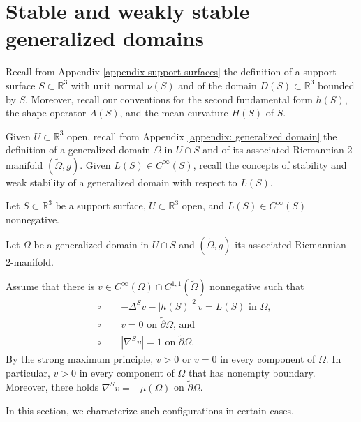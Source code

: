 \documentclass[11pt]{amsart}
\begin{document}
\section{Stable and weakly stable generalized domains}
	
	Recall from Appendix \ref{appendix support surfaces} the definition of a support surface $S\subset \mathbb{R}^3$ with unit normal $\nu(S)$  and of the domain $D(S)\subset \mathbb{R}^3$ bounded by $S$.  Moreover, recall our conventions for the second fundamental form $h(S)$, the shape operator $A(S)$, and the mean curvature $H(S)$ of $S$.
	
Given $U\subset \mathbb{R}^3$ open, recall from Appendix \ref{appendix: generalized domain} the definition of a generalized domain $\Omega$ in $U\cap S$ and of its associated Riemannian 2-manifold $(\tilde \Omega,g)$. Given $L(S)\in C^\infty(S)$, recall the concepts of stability and weak stability of a generalized domain  with respect to $L(S)$.
	
	Let $S\subset \mathbb{R}^3$ be a support surface, $U\subset \mathbb{R}^3$ open, and $L(S)\in C^\infty(S)$  nonnegative. 






Let $\Omega$ be a generalized domain in $U\cap S$ and $(\tilde \Omega,g)$ its associated Riemannian 2-manifold. 

Assume that there is  $ v\in C^\infty(\Omega)\cap C^{1,1}(\tilde \Omega)$ nonnegative
such that 
\begin{align}  
		&\circ \qquad \text{$-\Delta^S v-|h(S)|^2\,v=L(S)$ in $\Omega$, }\label{v assumptions 1}\\ 
	&\circ\qquad \text{$v=0$ on $\tilde \partial \Omega$, and} \label{v assumptions 2}\\
	&\circ \qquad \text{$|\nabla ^S v|=1$  on $\tilde \partial  \Omega$.} \label{v assumptions 3}
\end{align} 
By the strong maximum principle, $v>0$ or $v=0$ in every component of $\Omega$. In particular, $v>0$ in every component of $\Omega$ that has nonempty boundary. Moreover, there holds $\nabla^Sv=-\mu(\Omega)$ on $\tilde \partial \Omega$. 

In this section, we characterize such configurations in certain cases.
\end{document}
